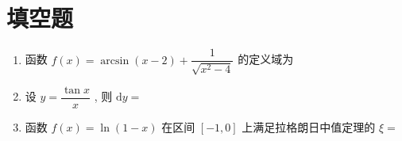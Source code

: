 \documentclass[twocolumn,UTF8]{ctexart}
\begin{document}
\section{填空题}
 \begin{enumerate}
\item 函数 $f(x)=\arcsin(x-2)+\dfrac{1}{\sqrt{x^2-4}}$ 的定义域为 \underline{\hspace{2.5cm}}\\[-0.3cm]
\item 设 $y=\dfrac{\tan x}{x}$ ,  则 $\mathrm{d}y=$ \underline{\hspace{2.5cm}}\\[-0.3cm]
\item 函数 $f(x)=\ln(1-x)$ 在区间 $[-1,0]$ 上满足拉格朗日中值定理的 $\xi=$ \underline{\hspace{2.5cm}}\\[-0.6cm]
\end{enumerate}
\end{document}
